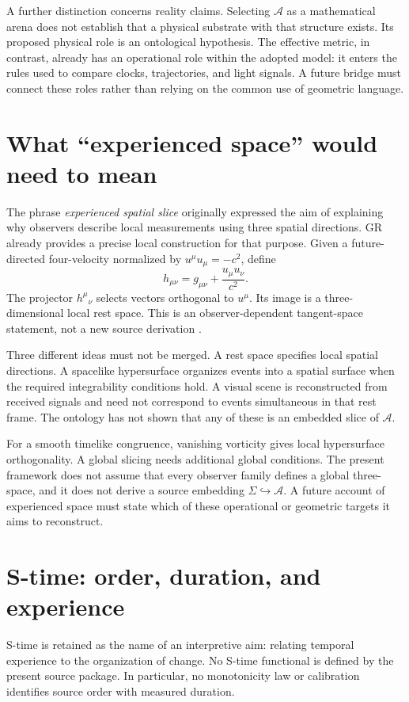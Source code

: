 \documentclass[11pt,oneside]{report}
\newcommand{\Sub}{\mathcal A}
\theoremstyle{remark}
\numberwithin{definition}{chapter}
\numberwithin{proposition}{chapter}
\numberwithin{remark}{chapter}
\begin{document}
A further distinction concerns reality claims. Selecting $\Sub$ as a mathematical arena does not establish that a physical substrate with that structure exists. Its proposed physical role is an ontological hypothesis. The effective metric, in contrast, already has an operational role within the adopted model: it enters the rules used to compare clocks, trajectories, and light signals. A future bridge must connect these roles rather than relying on the common use of geometric language.

\section{What ``experienced space'' would need to mean}
The phrase \emph{experienced spatial slice} originally expressed the aim of explaining why observers describe local measurements using three spatial directions. GR already provides a precise local construction for that purpose. Given a future-directed four-velocity normalized by $u^\mu u_\mu=-c^2$, define
\begin{equation}
h_{\mu\nu}=g_{\mu\nu}+\frac{u_\mu u_\nu}{c^2}.
\end{equation}
The projector $h^\mu{}_{\nu}$ selects vectors orthogonal to $u^\mu$. Its image is a three-dimensional local rest space. This is an observer-dependent tangent-space statement, not a new source derivation \parencite{EllisVanElst1999}.

Three different ideas must not be merged. A rest space specifies local spatial directions. A spacelike hypersurface organizes events into a spatial surface when the required integrability conditions hold. A visual scene is reconstructed from received signals and need not correspond to events simultaneous in that rest frame. The ontology has not shown that any of these is an embedded slice of $\Sub$.

For a smooth timelike congruence, vanishing vorticity gives local hypersurface orthogonality. A global slicing needs additional global conditions. The present framework does not assume that every observer family defines a global three-space, and it does not derive a source embedding $\Sigma\hookrightarrow\Sub$. A future account of experienced space must state which of these operational or geometric targets it aims to reconstruct.

\section{S-time: order, duration, and experience}
S-time is retained as the name of an interpretive aim: relating temporal experience to the organization of change. No S-time functional is defined by the present source package. In particular, no monotonicity law or calibration identifies source order with measured duration.
\end{document}
